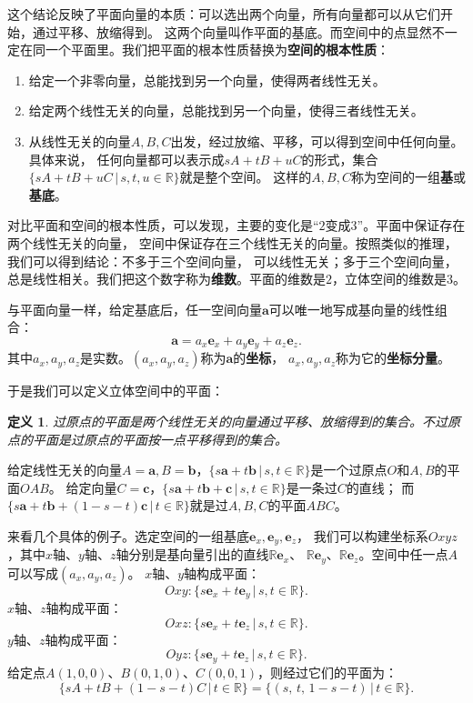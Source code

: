 \documentclass[12pt,UTF8]{ctexbook}
\newtheorem{df}{定义}[section]
\begin{document}
这个结论反映了平面向量的本质：可以选出两个向量，所有向量都可以从它们开始，通过平移、放缩得到。
这两个向量叫作平面的基底。而空间中的点显然不一定在同一个平面里。我们把平面的根本性质替换为\textbf{空间的根本性质}：

\begin{enumerate}
    \item 给定一个非零向量，总能找到另一个向量，使得两者线性无关。
    \item 给定两个线性无关的向量，总能找到另一个向量，使得三者线性无关。
    \item 从线性无关的向量$A, B, C$出发，经过放缩、平移，可以得到空间中任何向量。具体来说，
    任何向量都可以表示成$sA + tB + uC$的形式，集合$\{sA + tB + uC \, | \, s, t, u \in\mathbb{R}\}$就是整个空间。
    这样的$A, B, C$称为空间的一组\textbf{基}或\textbf{基底}。
\end{enumerate}

对比平面和空间的根本性质，可以发现，主要的变化是“$2$变成$3$”。平面中保证存在两个线性无关的向量，
空间中保证存在三个线性无关的向量。按照类似的推理，我们可以得到结论：不多于三个空间向量，
可以线性无关；多于三个空间向量，总是线性相关。我们把这个数字称为\textbf{维数}。平面的维数是$2$，立体空间的维数是$3$。

与平面向量一样，给定基底后，任一空间向量$\mathbf{a}$可以唯一地写成基向量的线性组合：
$$ \mathbf{a} = a_x\mathbf{e}_x + a_y\mathbf{e}_y + a_z\mathbf{e}_z.$$
其中$a_x, a_y, a_z$是实数。$(a_x, a_y, a_z)$称为$\mathbf{a}$的\textbf{坐标}，
$a_x, a_y, a_z$称为它的\textbf{坐标分量}。

于是我们可以定义立体空间中的平面：
\begin{df}
    过原点的平面是两个线性无关的向量通过平移、放缩得到的集合。不过原点的平面是过原点的平面按一点平移得到的集合。
\end{df}

给定线性无关的向量$A = \mathbf{a}, B = \mathbf{b}$，$ \{s\mathbf{a} + t\mathbf{b} \, | \, s, t\in\mathbb{R}\}$是一个过原点$O$和$A, B$的平面$OAB$。
给定向量$C = \mathbf{c}$，$ \{s\mathbf{a}+t\mathbf{b}+\mathbf{c}\, | \, s,t\in\mathbb{R}\}$是一条过$C$的直线；
而$ \{s\mathbf{a}+t\mathbf{b}+(1 - s - t)\mathbf{c} \, | \, t\in\mathbb{R}\}$就是过$A,B,C$的平面$ABC$。

来看几个具体的例子。选定空间的一组基底$\mathbf{e}_x,\mathbf{e}_y,\mathbf{e}_z$，
我们可以构建坐标系$Oxyz$，其中$x$轴、$y$轴、$z$轴分别是基向量引出的直线$\mathbb{R}\mathbf{e}_x$、
$\mathbb{R}\mathbf{e}_y$、$\mathbb{R}\mathbf{e}_z$。空间中任一点$A$可以写成$(a_x,a_y,a_z)$。
$x$轴、$y$轴构成平面：
$$ Oxy : \{s\mathbf{e}_x+t\mathbf{e}_y\,|\,s,t\in\mathbb{R}\}. $$
$x$轴、$z$轴构成平面：
$$ Oxz : \{s\mathbf{e}_x+t\mathbf{e}_z\,|\,s,t\in\mathbb{R}\}. $$
$y$轴、$z$轴构成平面：
$$ Oyz : \{s\mathbf{e}_y+t\mathbf{e}_z\,|\,s,t\in\mathbb{R}\}. $$
给定点$A(1,0,0)$、$B(0,1,0)$、$C(0,0,1)$，则经过它们的平面为：
$$ \{sA+tB+(1 - s - t)C \, | \, t\in\mathbb{R}\} = \{(s,\,t,\,1-s-t) \, | \, t\in\mathbb{R}\}. $$
\end{document}
